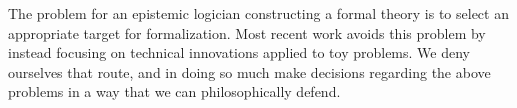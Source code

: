 The problem for an epistemic logician constructing a formal theory is to select an appropriate target for formalization. Most recent work avoids this problem by instead focusing on technical innovations applied to toy problems. We deny ourselves that route, and in doing so much make decisions regarding the above problems in a way that we can philosophically defend.

%
%




